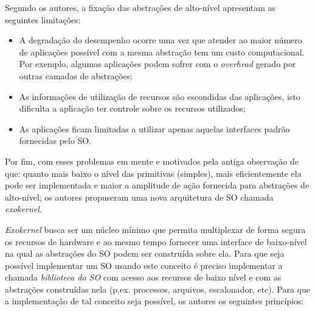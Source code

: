 Segundo os autores, a fixação das abstrações de alto-nível apresentam as
seguintes limitações:

\begin{itemize}
  \item A degradação do desempenho ocorre uma vez que atender ao maior número
        de aplicações possível com a mesma abstração tem um custo
        computacional. Por exemplo, algumas aplicações podem sofrer com o
        \emph{overhead} gerado por outras camadas de abstrações;
  \item As informações de utilização de recursos são escondidas das aplicações,
        isto dificulta a aplicação ter controle sobre os recursos utilizados;
  \item As aplicações ficam limitadas a utilizar apenas aquelas interfaces
        padrão fornecidas pelo SO.
\end{itemize}

Por fim, com esses problemas em mente e motivados pela antiga observação de que:
quanto mais baixo o nível das primitivas (simples), mais eficientemente ela
pode ser implementada e maior a amplitude de ação fornecida para abstrações de
alto-nível; os autores propuseram uma nova arquitetura de SO chamada
\emph{exokernel}.

\emph{Exokernel} busca ser um núcleo mínimo que permita multiplexar de forma
segura os recursos de hardware e ao mesmo tempo fornecer uma interface de
baixo-nível na qual as abstrações do SO podem ser construída sobre ela. Para
que seja possível implementar um SO usando este conceito é preciso implementar
a chamada \textit{biblioteca do SO} com acesso aos recursos de baixo nível e
com as abstrações construídas nela (p.ex. processos, arquivos, escalonador,
etc). Para que a implementação de tal conceito seja possível, os autores os
seguintes princípios:

